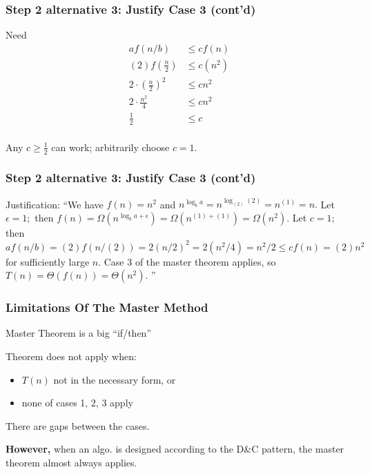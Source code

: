 \documentclass{beamer}
\begin{document}
\begin{frame} \frametitle{Step 2 alternative 3: Justify Case 3 (cont'd)}
  Need
  \begin{align*}
    a f(n/b) &\leq cf(n) \\
    (2) f(\frac{n}{2}) &\leq c(n^2) \\
    2 \cdot (\frac{n}{2})^2 &\leq c n^2 \\
    2 \cdot \frac{n^2}{4} &\leq c n^2 \\
    \frac{1}{2} &\leq c \\
  \end{align*}

  Any $c \geq \frac{1}{2}$ can work; arbitrarily choose $c=1.$
\end{frame}

\begin{frame} \frametitle{Step 2 alternative 3: Justify Case 3 (cont'd)}
 Justification: ``We have $f(n)=n^2$ and $n^{\log_b a} = n^{\log_{(2)} (2)} = n^{(1)} = n.$
 Let $\epsilon=1;$
  then $f(n) = \Omega(n^{\log_b a + \epsilon}) = \Omega(n^{(1)+(1)}) = \Omega(n^2).$
 Let $c=1;$ then
  $af(n/b) = (2)f(n/(2)) = 2(n/2)^2 = 2(n^2/4) = n^2/2 \leq cf(n) = (2)n^2$ for sufficiently large $n$.
  Case 3 of the master theorem applies, so $T(n)=\Theta(f(n)) = \Theta(n^2).$ ''
 \end{frame}

 \begin{frame} \frametitle{Limitations Of The Master Method}
  Master Theorem is a big ``if/then''
  \vspace{10pt}

Theorem does not apply when:
\begin{itemize}
  \item $T(n)$ not in the necessary form, or
  \item none of cases 1, 2, 3 apply
\end{itemize}
\vspace{10pt}

There are gaps between the cases.
\vspace{10pt}

\textbf{However,} when an algo. is designed according to the D\&C pattern, the master theorem almost always applies.

\end{frame}
 
\end{document}
